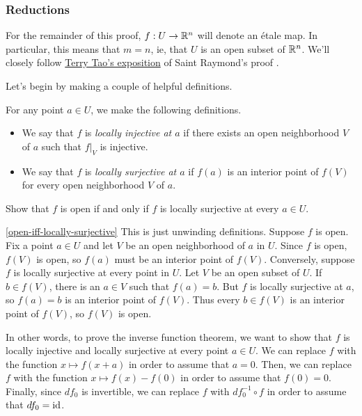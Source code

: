 \subsubsection*{Reductions}

For the remainder of this proof, $f : U \to \mathbb{R}^n$ will denote an \'etale map. In particular, this means that $m = n$, ie, that $U$ is an open subset of $\mathbb{R}^n$. We'll closely follow  \href{https://terrytao.wordpress.com/2011/09/12/the-inverse-function-theorem-for-everywhere-differentiable-maps/#more-5298}{Terry Tao's exposition} of Saint Raymond's proof \cite{saint-raymond}. 

Let's begin by making a couple of helpful definitions. 

\begin{definition}
	For any point $a \in U$, we make the following definitions. 
	\begin{itemize}
		\item We say that $f$ is \emph{locally injective at $a$} if there exists an open neighborhood $V$ of $a$ such that $f|_V$ is injective. 
		\item We say that $f$ is \emph{locally surjective at $a$} if $f(a)$ is an interior point of $f(V)$ for every open neighborhood $V$ of $a$. 
	\end{itemize}
\end{definition}

\begin{exercise} \label{open-iff-locally-surjective}
	Show that $f$ is open if and only if $f$ is locally surjective at every $a \in U$. 
\end{exercise}

\begin{solution}{\cref{open-iff-locally-surjective}}
	This is just unwinding definitions. Suppose $f$ is open. Fix a point $a \in U$ and let $V$ be an open neighborhood of $a$ in $U$. Since $f$ is open, $f(V)$ is open, so $f(a)$ must be an interior point of $f(V)$. Conversely, suppose $f$ is locally surjective at every point in $U$. Let $V$ be an open subset of $U$. If $b \in f(V)$, there is an $a \in V$ such that $f(a) = b$. But $f$ is locally surjective at $a$, so $f(a) = b$ is an interior point of $f(V)$. Thus every $b \in f(V)$ is an interior point of $f(V)$, so $f(V)$ is open. 
\end{solution}

In other words, to prove the inverse function theorem, we want to show that $f$ is locally injective and locally surjective at every point $a \in U$. We can replace $f$ with the function $x \mapsto f(x+a)$ in order to assume that $a = 0$. Then, we can replace $f$ with the function $x \mapsto f(x) - f(0)$ in order to assume that $f(0) = 0$. Finally, since $df_0$ is invertible, we can replace $f$ with $df_0^{-1} \circ f$ in order to assume that $df_0 = \mathrm{id}$. 

